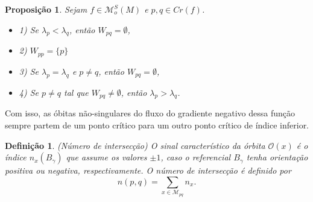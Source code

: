 \documentclass{beamer}
\newtheorem{definicao}[teorema]{Definição}
\newtheorem{proposicao}[teorema]{Proposição}
\newcommand{\espacomoduli}[2]{\mathcal{M}_{#1#2}}
\newcommand{\funcoesmorsesmale}[1]{\mathcal{M}^{S}_{o}(#1)}
\newcommand{\orbitaponto}[1]{\mathcal{O}(#1)}
\newcommand{\pontoscriticos}[1]{\textit{Cr}(#1)}
\newcommand{\variedadeconectantepontos}[2]{W_{#1#2}}
\begin{document}
\begin{frame}
	\begin{proposicao}
		Sejam $f \in \funcoesmorsesmale{M}$ e $p,q \in \pontoscriticos{f}$.
		\begin{itemize}
			\item 1) Se $\lambda_{p}<\lambda_{q}$, então $\variedadeconectantepontos{p}{q} = \emptyset$,
			
			\item 2) $\variedadeconectantepontos{p}{p} = \{p\}$
			
			\item 3) Se $\lambda_{p} = \lambda_{q}$ e $p\neq q$, então $\variedadeconectantepontos{p}{q} = \emptyset$,
			
			\item 4) Se $p \neq q$ tal que $\variedadeconectantepontos{p}{q} \neq \emptyset$, então $\lambda_{p}>\lambda_{q}$.
		\end{itemize}
	\end{proposicao}

	Com isso, as óbitas não-singulares do fluxo do gradiente negativo dessa função sempre partem de um ponto crítico para um outro ponto crítico de índice inferior.
		
\end{frame}

\begin{frame}
\begin{definicao}
	(Número de intersecção) O sinal característico da órbita $\orbitaponto{x}$ é o índice $n_{x}(B_{\gamma})$ que assume os valores $\pm 1$, caso o referencial $B_{\gamma}$ tenha orientação positiva ou negativa, respectivamente. O número de intersecção é definido por 
	$$
	n(p,q) = \sum_{x \in \espacomoduli{p}{q} }n_{x}.
	$$
\end{definicao}

\end{frame}

\begin{frame}
	
\end{frame}
\end{document}
